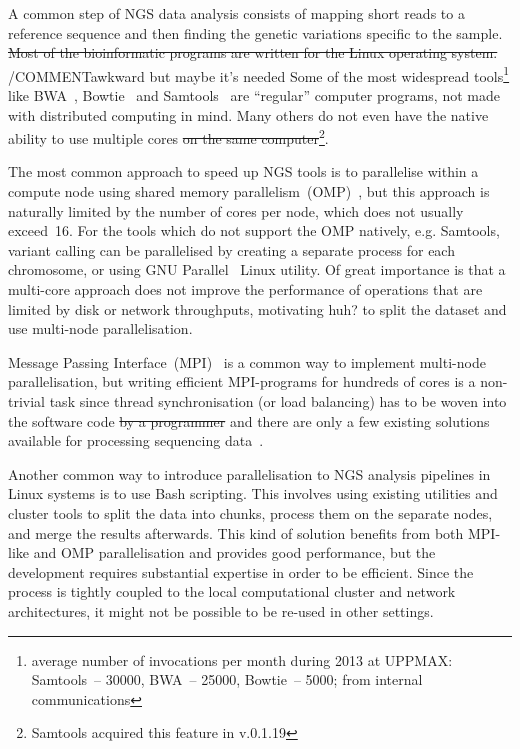 \documentclass[11pt, oneside]{article}   	%
\newcommand{\COMMENT}[1]{{\color{red} #1 }}
\begin{document}
A common step of NGS data analysis consists of mapping short reads to a reference sequence and then finding the genetic variations specific to the sample. \sout{Most of the bioinformatic programs are written for the Linux operating system.} /COMMENT{awkward but maybe it's needed} Some of the most widespread tools\footnote{average number of invocations per month during 2013 at UPPMAX: Samtools~-- 30000, BWA~-- 25000, Bowtie~-- 5000; from internal communications} like BWA~\cite{bwa}, Bowtie~\cite{bowtie} and Samtools~\cite{samtools} are ``regular'' computer programs, not made with distributed computing in mind. Many others do not even have the native ability to use multiple cores \sout{on the same computer}\footnote{Samtools acquired this feature in v.0.1.19}.


The most common approach to speed up NGS tools is to parallelise within a compute node using shared memory parallelism~(OMP)~\cite{openmp}, but this approach is naturally limited by the number of cores per node, which does not usually exceed~16.  For the tools which do not support the OMP natively, e.g. Samtools, variant calling can be parallelised by creating a separate process  for  each chromosome, or using GNU Parallel~\cite{gnuparallel} Linux utility.
Of great importance is that a multi-core approach does not improve the performance of operations that are limited by disk or network throughputs, motivating \COMMENT{huh?} to split the dataset and use multi-node parallelisation. 

Message Passing Interface~(MPI)~\cite{mpi1} is a common way to implement multi-node parallelisation, but writing efficient MPI-programs for hundreds of cores is a non-trivial task since thread synchronisation (or load balancing) has to be woven into the software code \sout{by a programmer} and there are only a few existing solutions available for processing sequencing data~\cite{pmap, erne, gnumap}.

Another common way to introduce parallelisation to NGS analysis pipelines in Linux systems is to use Bash scripting. This involves using existing utilities and cluster tools to split the data into chunks, process them on the separate nodes, and merge the results afterwards. This kind of solution benefits from both MPI-like and OMP parallelisation and provides good performance, but the development requires substantial expertise in order to be efficient. Since the process is tightly coupled to the local computational cluster and network architectures, it might not be possible to be re-used in other settings.
\end{document}
